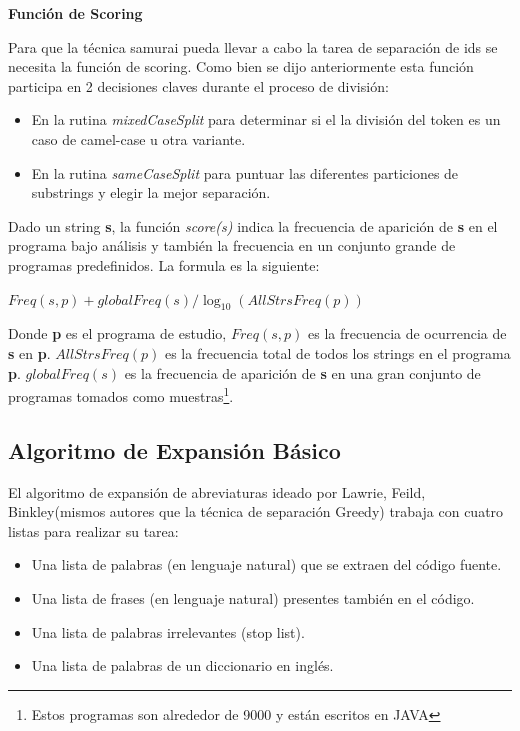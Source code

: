 \documentclass[12pt]{report}
\begin{document}
\noindent \textbf{Función de Scoring}

Para que la técnica samurai pueda llevar a cabo la tarea de separación de ids se necesita la función de scoring. Como bien se dijo anteriormente esta función participa en 2 decisiones claves durante el proceso de división:

\begin{itemize}
\itemsep0em%
\item En la rutina \textit{mixedCaseSplit} para determinar si el la división del token es un caso de camel-case u otra variante.

\item En la rutina \textit{sameCaseSplit} para puntuar las diferentes particiones de substrings y elegir la mejor separación.
\end{itemize}

Dado un string \textbf{s}, la función \textit{score(s)} indica la frecuencia de aparición de \textbf{s} en el programa bajo análisis y también la frecuencia en un conjunto grande de programas predefinidos. La formula es la siguiente:

\begin{center}
$Freq(s,p) + globalFreq(s) / \log_{10}(AllStrsFreq(p))$
\end{center}

Donde \textbf{p} es el programa de estudio, $Freq(s,p)$ es la frecuencia de ocurrencia de \textbf{s} en \textbf{p}. $AllStrsFreq(p)$ es la frecuencia total de todos los strings en el programa \textbf{p}. $globalFreq(s)$ es la frecuencia de aparición de \textbf{s} en una gran conjunto de programas tomados como muestras\footnote[1]{Estos programas son alrededor de 9000 y están escritos en JAVA}\cite{EHPV09}.

\pagebreak
\subsection{Algoritmo de Expansión Básico}

El algoritmo de expansión de abreviaturas ideado por Lawrie, Feild, Binkley(mismos autores que la técnica de separación Greedy)\cite{LFBEX07, EZH08} trabaja con cuatro listas para realizar su tarea:

\begin{itemize}
\itemsep0em%
\item Una lista de palabras (en lenguaje natural) que se extraen del código fuente.
\item Una lista de frases (en lenguaje natural) presentes también en el código.
\item Una lista de palabras irrelevantes (stop list).
\item Una lista de palabras de un diccionario en inglés.
\end{itemize}
\end{document}
